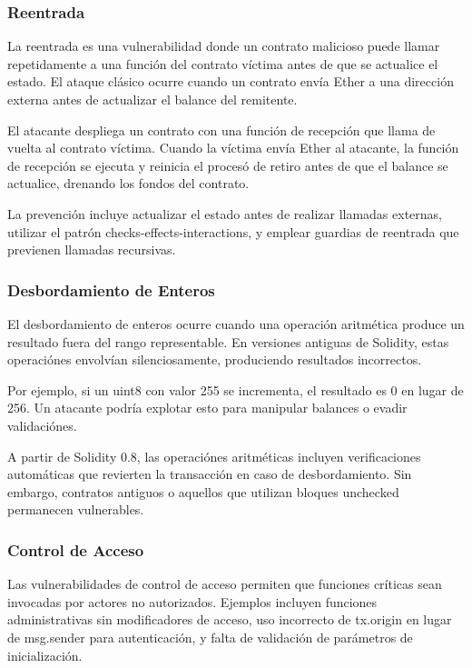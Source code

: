 \documentclass[12pt,a4paper,twoside]{book}
\begin{document}
\subsubsection{Reentrada}

La reentrada es una vulnerabilidad donde un contrato malicioso puede llamar repetidamente a una función del contrato víctima antes de que se actualice el estado. El ataque clásico ocurre cuando un contrato envía Ether a una dirección externa antes de actualizar el balance del remitente.

El atacante despliega un contrato con una función de recepción que llama de vuelta al contrato víctima. Cuando la víctima envía Ether al atacante, la función de recepción se ejecuta y reinicia el procesó de retiro antes de que el balance se actualice, drenando los fondos del contrato.

La prevención incluye actualizar el estado antes de realizar llamadas externas, utilizar el patrón checks-effects-interactions, y emplear guardias de reentrada que previenen llamadas recursivas.

\subsubsection{Desbordamiento de Enteros}

El desbordamiento de enteros ocurre cuando una operación aritmética produce un resultado fuera del rango representable. En versiones antiguas de Solidity, estas operaciónes envolvían silenciosamente, produciendo resultados incorrectos.

Por ejemplo, si un uint8 con valor 255 se incrementa, el resultado es 0 en lugar de 256. Un atacante podría explotar esto para manipular balances o evadir validaciónes.

A partir de Solidity 0.8, las operaciónes aritméticas incluyen verificaciones automáticas que revierten la transacción en caso de desbordamiento. Sin embargo, contratos antiguos o aquellos que utilizan bloques unchecked permanecen vulnerables.

\subsubsection{Control de Acceso}

Las vulnerabilidades de control de acceso permiten que funciones críticas sean invocadas por actores no autorizados. Ejemplos incluyen funciones administrativas sin modificadores de acceso, uso incorrecto de tx.origin en lugar de msg.sender para autenticación, y falta de validación de parámetros de inicialización.
\end{document}
